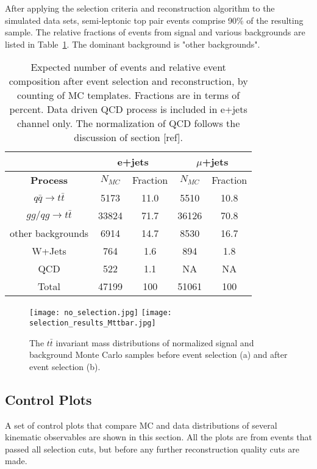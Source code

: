 \documentclass{cmspaperpdf}
\begin{document}
After applying the selection criteria and reconstruction algorithm to the simulated data sets, semi-leptonic top pair events comprise 90\% of the resulting sample. The relative fractions of events from signal and various backgrounds are listed in Table~\ref{tab:mc_fractions}. The dominant background is "other backgrounds". 

\begin{table}[h!]
\small
\centering
\begin{tabular}{|c | c  c | c  c|}
\hline
 & \multicolumn{2}{|c|}{e+jets}&\multicolumn{2}{|c|}{$\mu$+jets} \\
\hline
\textbf{Process} & $N_{MC}$ & Fraction & $N_{MC}$ & Fraction \\
\hline
$q\bar{q}\rightarrow t\bar{t}$ & 5173 & 11.0 & 5510 & 10.8 \\
$gg/qg\rightarrow t\bar{t}$ & 33824 & 71.7 & 36126 & 70.8 \\ 
other backgrounds & 6914 & 14.7 & 8530 & 16.7 \\ 
W+Jets & 764 & 1.6 & 894 & 1.8 \\
QCD &522 & 1.1 & NA & NA \\
Total & 47199 & 100 & 51061 & 100 \\
\hline
\end{tabular}
\caption{\small Expected number of events and relative event composition after event selection and reconstruction, by counting of MC templates. Fractions are in terms of percent. Data driven QCD process is included in e+jets channel only. The normalization of QCD follows the discussion of section [ref]. }
\label{tab:mc_fractions}

\end{table}

\begin{figure}[h!]
\texttt{[image: no\_selection.jpg]}
\texttt{[image: selection\_results\_Mttbar.jpg]}
\centering
\caption{\small \small The $t\bar{t}$ invariant mass distributions of normalized signal and background Monte Carlo samples before event selection (a) and after event selection (b). }
\label{tagging_results}
\end{figure}

\subsection{Control Plots}
A set of control plots that compare MC and data distributions of several kinematic observables are shown in this section. All the plots are from events that passed all selection cuts, but before any further reconstruction quality cuts are made. 
\end{document}
